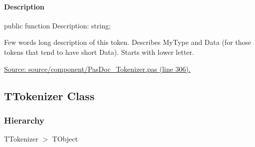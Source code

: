\documentclass{report}
\newif\ifpdf
\begin{document}
\paragraph*{Description}\hspace*{\fill}

\label{PasDoc_Tokenizer.TToken-Description}
\begin{list}{}{
\setlength{\itemindent}{0cm}
\setlength{\listparindent}{0cm}
\setlength{\leftmargin}{\evensidemargin}
\addtolength{\leftmargin}{\tmplength}
\settowidth{\labelsep}{X}
\addtolength{\leftmargin}{\labelsep}
\setlength{\labelwidth}{\tmplength}
}
\item[\textbf{Declaration}\hfill]
\ifpdf
\begin{flushleft}
\fi
\begin{ttfamily}
public function Description: string;\end{ttfamily}

\ifpdf
\end{flushleft}
\fi

\par
\item[\textbf{Description}]
Few words long description of this token. Describes MyType and Data (for those tokens that tend to have short Data). Starts with lower letter.\par
\href{https://github.com/pasdoc/pasdoc/blob/master/source/component/PasDoc_Tokenizer.pas#L306}{Source: source/component/PasDoc{\_}Tokenizer.pas (line 306).}

\end{list}
\ifpdf
\subsection*{\large{\textbf{TTokenizer Class}}\normalsize\hspace{1ex}\hrulefill}
\else
\subsection*{TTokenizer Class}
\fi
\label{PasDoc_Tokenizer.TTokenizer}
\subsubsection*{\large{\textbf{Hierarchy}}\normalsize\hspace{1ex}\hfill}
TTokenizer {$>$} TObject
\end{document}
